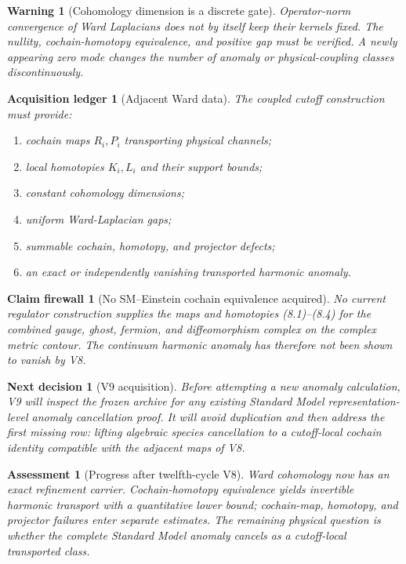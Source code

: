 \documentclass[11pt]{article}
\newtheorem{warning}[theorem]{Warning}
\newtheorem{firewall}[theorem]{Claim firewall}
\newtheorem{decision}[theorem]{Next decision}
\newtheorem{assessment}[theorem]{Assessment}
\newtheorem{ledger}[theorem]{Acquisition ledger}
\theoremstyle{remark}
\begin{document}
\begin{warning}[Cohomology dimension is a discrete gate]
\label{warn:v12v8-dimension}
Operator-norm convergence of Ward Laplacians does not by itself keep
their kernels fixed.  The nullity, cochain-homotopy equivalence, and
positive gap must be verified.  A newly appearing zero mode changes
the number of anomaly or physical-coupling classes discontinuously.
\end{warning}

\begin{ledger}[Adjacent Ward data]
\label{led:v12v8-data}
The coupled cutoff construction must provide:
\begin{enumerate}
\item cochain maps \(R_i,P_i\) transporting physical channels;
\item local homotopies \(K_i,L_i\) and their support bounds;
\item constant cohomology dimensions;
\item uniform Ward-Laplacian gaps;
\item summable cochain, homotopy, and projector defects;
\item an exact or independently vanishing transported harmonic
      anomaly.
\end{enumerate}
\end{ledger}

\begin{firewall}[No SM--Einstein cochain equivalence acquired]
\label{fire:v12v8-boundary}
No current regulator construction supplies the maps and homotopies
(8.1)--(8.4) for the combined gauge, ghost, fermion, and
diffeomorphism complex on the complex metric contour.  The continuum
harmonic anomaly has therefore not been shown to vanish by V8.
\end{firewall}

\begin{decision}[V9 acquisition]
\label{dec:v12v8-next}
Before attempting a new anomaly calculation, V9 will inspect the
frozen archive for any existing Standard Model representation-level
anomaly cancellation proof.  It will avoid duplication and then
address the first missing row: lifting algebraic species
cancellation to a cutoff-local cochain identity compatible with the
adjacent maps of V8.
\end{decision}

\begin{assessment}[Progress after twelfth-cycle V8]
\label{ass:v12v8-status}
Ward cohomology now has an exact refinement carrier.  Cochain-homotopy
equivalence yields invertible harmonic transport with a quantitative
lower bound; cochain-map, homotopy, and projector failures enter
separate estimates.  The remaining physical question is whether the
complete Standard Model anomaly cancels as a cutoff-local transported
class.
\end{assessment}
\end{document}
